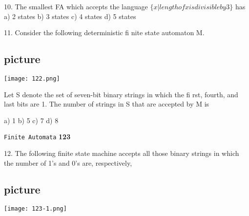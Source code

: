 \documentclass{article}
\begin{document}
10. The smallest FA which accepts the language $\{x | length of x is divisible by 3\}$ has\\

\vspace*{0.2cm}
\hspace{0.5cm}
a) 2 states  \hspace*{0.5cm}  b) 3 states  \hspace*{0.5cm}   c) 4 states  \hspace*{0.5cm}  d) 5 states \\
\vspace*{0.2cm}

11. Consider the following deterministic fi nite state automaton M.\\

\begin{center}
\section{picture}
\texttt{[image: 122.png]}
\end{center}

\hspace{0.5cm}
Let S denote the set of seven-bit binary strings in which the fi rst, fourth, and last bits are 1. The
number of strings in S that are accepted by M is \\
\vspace*{0.2cm}

\hspace{0.5cm}
a) 1  \hspace*{0.5cm}  b) 5  \hspace*{0.5cm}   c) 7  \hspace*{0.5cm}  d) 8 \\
\vspace*{0.2cm}

\newpage
\begin{flushright}
 \texttt{Finite Automata} \hspace*{1cm} \textbf{123}
\end{flushright}

\vspace*{0.5cm}
12. The following finite state machine accepts all those binary strings in which the number of 1’s and
0’s are, respectively,\\

\begin{center}
\section{picture}
\texttt{[image: 123-1.png]}
\end{center}
\end{document}
